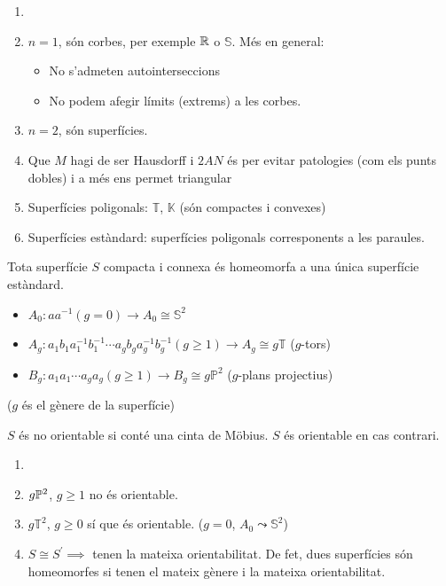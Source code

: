 \begin{example}
	\begin{enumerate}
		\item[]
		\item $n = 1$, són corbes, per exemple $\mathbb{R}$ o $\mathbb{S}$. Més en general:
			\begin{itemize}
				\item No s'admeten autointerseccions
				\item No podem afegir límits (extrems) a les corbes.
			\end{itemize}
		\item $n = 2$, són superfícies.
		\item Que $M$ hagi de ser Hausdorff i $2AN$ és per evitar patologies (com els punts
			dobles) i a més ens permet triangular
		\item Superfícies poligonals: $\mathbb{T}$, $\mathbb{K}$ (són compactes i convexes)
		\item Superfícies estàndard: superfícies poligonals corresponents a les paraules.
	\end{enumerate}
\end{example}

\begin{teo*}[C]
	Tota superfície $S$ compacta i connexa és homeomorfa a una única superfície estàndard.
	\begin{itemize}
		\item $A_0 \colon aa^{-1} (g = 0) \rightarrow A_0 \cong \mathbb{S}^2$
		\item $A_g \colon a_1b_1a^{-1}_1 b^{-1}_1 \cdots a_gb_ga^{-1}_gb^{-1}_g (g \geq 1)
			\rightarrow A_g \cong g \mathbb{T}$ ($g$-tors)
		\item $B_g \colon a_1a_1 \cdots a_ga_g (g \geq 1) \rightarrow B_g \cong g \mathbb{P}^2$
			($g$-plans projectius)
	\end{itemize}
	($g$ és el gènere de la superfície)
\end{teo*}

\begin{defi}[Orientabilitat]
	$S$ és no orientable si conté una cinta de Möbius. $S$ és orientable en cas contrari.
\end{defi}

\begin{example}
	\begin{enumerate}
		\item[]
		\item $g \mathbb{P}^2$, $g \geq 1$ no és orientable.
		\item $g \mathbb{T}^2$, $g \geq 0$ sí que és orientable. ($g = 0$, $A_0 \leadsto \mathbb{S}^2$)
		\item $S \cong S^\prime \implies $ tenen la mateixa orientabilitat. De fet, dues superfícies
			són homeomorfes si tenen el mateix gènere i la mateixa orientabilitat.
	\end{enumerate}
\end{example}

